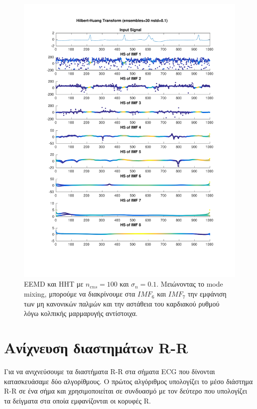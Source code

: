 \documentclass[11pt,a4paper]{article}
\begin{document}
\begin{figure}[H]
\begin{minipage}{0.48\textwidth}
	\includegraphics[width=\textwidth]{fig/221l1_hht_ensemble.pdf}
\end{minipage}
\vfill
\caption{EEMD και HHT με $n_{ens}=100$ και $\sigma_n = 0.1$. Μειώνοντας το mode mixing, μπορούμε να διακρίνουμε στα $IMF_{6}$ και $IMF_{7}$ την εμφάνιση των μη κανονικών παλμών και την αστάθεια του καρδιακού ρυθμού λόγω κολπικής μαρμαρυγής αντίστοιχα.}
\label{fig:221l1_hht_ensemble}
\end{figure}

\section*{Ανίχνευση διαστημάτων R-R}

Για να ανιχνεύσουμε τα διαστήματα R-R στα σήματα ECG που δίνονται κατασκευάσαμε δύο αλγορίθμους. Ο πρώτος αλγόριθμος υπολογίζει το μέσο διάστημα R-R σε ένα σήμα και χρησιμοποιείται σε συνδυασμό με τον δεύτερο που υπολογίζει τα δείγματα στα οποία εμφανίζονται οι κορυφές R.
\end{document}

